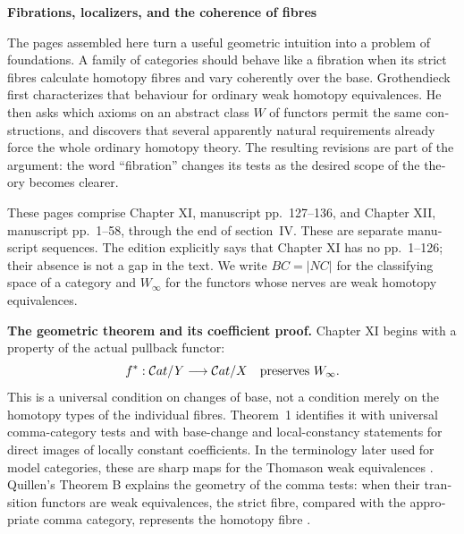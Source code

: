 \begin{otherlanguage}{english}
\begin{otherlanguage}{english}
\noindent\textbf{Fibrations, localizers, and the coherence of fibres}

\medskip
The pages assembled here turn a useful geometric intuition into a problem of foundations. A family of categories should behave like a fibration when its strict fibres calculate homotopy fibres and vary coherently over the base. Grothendieck first characterizes that behaviour for ordinary weak homotopy equivalences. He then asks which axioms on an abstract class \(W\) of functors permit the same constructions, and discovers that several apparently natural requirements already force the whole ordinary homotopy theory. The resulting revisions are part of the argument: the word “fibration” changes its tests as the desired scope of the theory becomes clearer.

These pages comprise Chapter XI, manuscript pp.~127--136, and Chapter XII, manuscript pp.~1--58, through the end of section~IV. These are separate manuscript sequences. The edition explicitly says that Chapter XI has no pp.~1--126; their absence is not a gap in the text. We write \(BC=|NC|\) for the classifying space of a category and \(W_\infty\) for the functors whose nerves are weak homotopy equivalences.

\medskip
\noindent\textbf{The geometric theorem and its coefficient proof.}
Chapter XI begins with a property of the actual pullback functor:
\[
 f^*:\mathcal{C}at/Y\longrightarrow\mathcal{C}at/X
 \quad\hbox{preserves }W_\infty.
\]
This is a universal condition on changes of base, not a condition merely on the homotopy types of the individual fibres. Theorem~1 identifies it with universal comma-category tests and with base-change and local-constancy statements for direct images of locally constant coefficients. In the terminology later used for model categories, these are sharp maps for the Thomason weak equivalences \citep[\S2]{Rezk1998Sharp}. Quillen's Theorem B explains the geometry of the comma tests: when their transition functors are weak equivalences, the strict fibre, compared with the appropriate comma category, represents the homotopy fibre \citep[\S1]{Quillen1973}.


\end{otherlanguage}
\end{otherlanguage}
